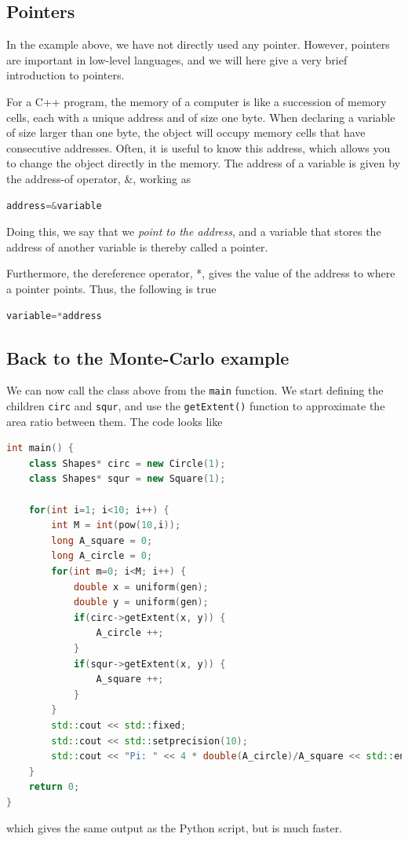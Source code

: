 \subsection{Pointers}
In the example above, we have not directly used any pointer. However, pointers are important in low-level languages, and we will here give a very brief introduction to pointers.

For a C++ program, the memory of a computer is like a succession of memory cells, each with a unique address and of size one byte. When declaring a variable of size larger than one byte, the object will occupy memory cells that have consecutive addresses. Often, it is useful to know this address, which allows you to change the object directly in the memory. The address of a variable is given by the address-of operator, \&, working as
\lstset{basicstyle=\scriptsize}
\begin{lstlisting}[language=C++]
address=&variable
\end{lstlisting}
Doing this, we say that we \textit{point to the address}, and a variable that stores the address of another variable is thereby called a pointer. 

Furthermore, the dereference operator, *, gives the value of the address to where a pointer points. Thus, the following is true
\begin{lstlisting}[language=C++]
variable=*address
\end{lstlisting}

\subsection{Back to the Monte-Carlo example}
We can now call the class above from the \texttt{main} function. We start defining the children \texttt{circ} and \texttt{squr}, and use the \texttt{getExtent()} function to approximate the area ratio between them. The code looks like 
\begin{lstlisting}[language=c++]
int main() {   
	class Shapes* circ = new Circle(1);
	class Shapes* squr = new Square(1);

	for(int i=1; i<10; i++) {
		int M = int(pow(10,i));
		long A_square = 0;
		long A_circle = 0;
		for(int m=0; i<M; i++) {
			double x = uniform(gen);
			double y = uniform(gen);
			if(circ->getExtent(x, y)) {
				A_circle ++;
			}
			if(squr->getExtent(x, y)) {
				A_square ++;
			}
		}
		std::cout << std::fixed;
		std::cout << std::setprecision(10);
		std::cout << "Pi: " << 4 * double(A_circle)/A_square << std::endl;
	}
	return 0;
}
\end{lstlisting}
which gives the same output as the Python script, but is much faster. 


